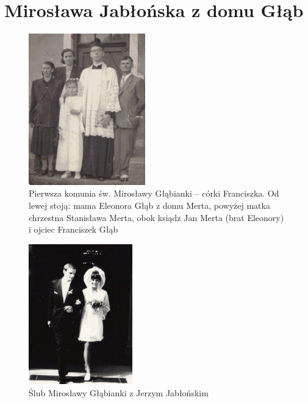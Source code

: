 \section{Mirosława Jabłońska z domu Głąb}
   
\begin{figure}[!h]
\begin{center}
\includegraphics[width=0.45\textwidth]{zdjecia/pierwsza_komunia_miroslawy_glab.jpg}
\caption[Pierwsza komunia św. Mirosławy Głąbianki]{Pierwsza komunia św. Mirosławy Głąbianki -- córki Franciszka. Od lewej stoją: mama Eleonora Głąb z domu Merta, powyżej matka chrzestna Stanisława Merta, obok ksiądz Jan Merta (brat Eleonory) i ojciec Franciszek Głąb}
\label{rys:pierwsza_komunia_miroslawy_glab}
\end{center}
\end{figure}

\begin{figure}[!hb]
\begin{center}
\includegraphics[width=0.4\textwidth]{zdjecia/slub_jerzego_i_miroslawy_jablonskich.jpg}
\caption{Ślub Mirosławy Głąbianki z Jerzym Jabłońskim}
\label{rys:slub_jerzego_i_miroslawy_jablonskich}
\end{center}
\end{figure}

